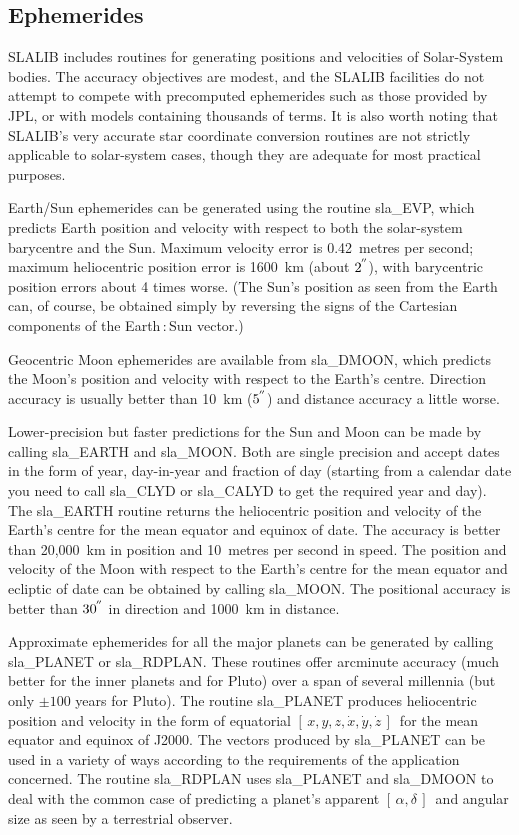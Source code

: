 \documentclass[11pt,twoside]{article}
\newcommand{\radec}     {$[\,\alpha,\delta\,]$}
\newcommand{\xyzxyzd}   {$[\,x,y,z,\dot{x},\dot{y},\dot{z}\,]$}
\newcommand{\arcseci}[1] {$#1\hspace{-0.05em}$\raisebox{-0.5ex}
                         {$^{'\hspace{-0.1em}'}$}}
\renewcommand{\arcseci}[1] {$#1\hspace{-0.05em}^{'\hspace{-0.1em}'}$}
\begin{document}
\label{ephem}
\subsection{Ephemerides}
SLALIB includes routines for generating positions and
velocities of Solar-System bodies.  The accuracy objectives are
modest, and the SLALIB facilities do not attempt
to compete with precomputed ephemerides such as
those provided by JPL, or with models containing
thousands of terms.  It is also worth noting
that SLALIB's very accurate star coordinate conversion
routines are not strictly applicable to solar-system cases,
though they are adequate for most practical purposes.

Earth/Sun ephemerides can be generated using the routine
sla\_EVP,
which predicts Earth position and velocity with respect to both the
solar-system barycentre and the
Sun.  Maximum velocity error is 0.42~metres per second;  maximum
heliocentric position error is 1600~km (about \arcseci{2}), with
barycentric position errors about 4 times worse.
(The Sun's position as
seen from the Earth can, of course, be obtained simply by
reversing the signs of the Cartesian components of the
Earth\,:\,Sun vector.)

Geocentric Moon ephemerides are available from
sla\_DMOON,
which predicts the Moon's position and velocity with respect to
the Earth's centre.  Direction accuracy is usually better than
10~km (\arcseci{5}) and distance accuracy a little worse.

Lower-precision but faster predictions for the Sun and Moon
can be made by calling
sla\_EARTH
and
sla\_MOON.
Both are single precision and accept dates in the form of
year, day-in-year and fraction of day
(starting from a calendar date you need to call
sla\_CLYD
or
sla\_CALYD
to get the required year and day).
The
sla\_EARTH
routine returns the heliocentric position and velocity
of the Earth's centre for the mean equator and
equinox of date.  The accuracy is better than 20,000~km in position
and 10~metres per second in speed.
The
position and velocity of the Moon with respect to the
Earth's centre for the mean equator and ecliptic of date
can be obtained by calling
sla\_MOON.
The positional accuracy is better than \arcseci{30} in direction
and 1000~km in distance.

Approximate ephemerides for all the major planets
can be generated by calling
sla\_PLANET
or
sla\_RDPLAN.  These routines offer arcminute accuracy (much
better for the inner planets and for Pluto) over a span of several
millennia (but only $\pm100$ years for Pluto).
The routine
sla\_PLANET produces heliocentric position and
velocity in the form of equatorial \xyzxyzd\ for the
mean equator and equinox of J2000.  The vectors
produced by
sla\_PLANET
can be used in a variety of ways according to the
requirements of the application concerned.  The routine
sla\_RDPLAN
uses
sla\_PLANET
and
sla\_DMOON
to deal with the common case of predicting
a planet's apparent \radec\ and angular size as seen by a
terrestrial observer.
\end{document}
